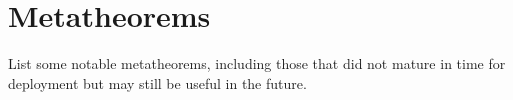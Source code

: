 
\section{Metatheorems}


List some notable metatheorems, including those that did not mature in time for deployment but may still be useful in the future.

